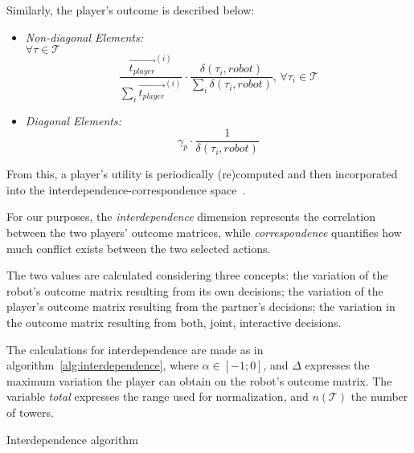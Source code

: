 Similarly, the player's outcome is described below:
\begin{itemize}
\item \textit{Non-diagonal Elements:}\\
$\forall\tau \in \mathcal{T}$\\
\begin{equation}
\label{for:Non-DiagonalPlayer}
 \frac{\overrightarrow{t_{player}}^{(i)}}{\sum_{i}{\overrightarrow{t_{player}}^{(i)}}} \cdot \frac{\delta(\tau_{i},robot)}{\sum_{i}{\delta(\tau_{i},robot)}}, \, \forall\tau_{i} \in \mathcal{T} 
\end{equation}
\item \textit{Diagonal Elements:}
\begin{equation}
\label{for:DiagonalPlayer}
\gamma_p \cdot \frac{1}{\delta(\tau_{i},robot)}
\end{equation}
\end{itemize}

From this, a player's utility is periodically (re)computed and then incorporated into the interdependence-correspondence space~\citep{wagner_acting_2011}.

For our purposes, the \textit{interdependence} dimension represents the correlation between the two players' outcome matrices, while \textit{correspondence} quantifies how much conflict exists between the two selected actions.

The two values are calculated considering three concepts: the variation of the robot's outcome matrix resulting from its own decisions; the variation of the player's outcome matrix resulting from the partner's decisions; the variation in the outcome matrix resulting from both, joint, interactive decisions.

The calculations for interdependence are made as in algorithm~\ref{alg:interdependence}, where $\alpha \in[-1;0]$, and $\Delta$ expresses the maximum variation the player can obtain on the robot's outcome matrix. The variable \textit{total} expresses the range used for normalization, and $n(\mathcal{T})$ the number of towers.

\begin{algorithm}[h]
\SetAlgoLined
{}
\BlankLine
{}
\caption{Interdependence algorithm}
\label{alg:interdependence}
\end{algorithm}

